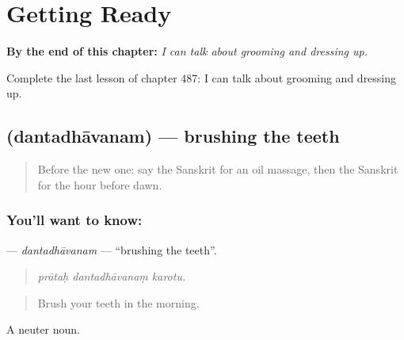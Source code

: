 
\chapter{Getting Ready}
\label{ch:sa-getting-ready}

\begin{chapteropening}
\textbf{By the end of this chapter:} \emph{I can talk about grooming and dressing up.}

Complete the last lesson of chapter 487: I can talk about grooming and dressing up.
\end{chapteropening}

\section[\texorpdfstring{\sk{दन्तधावनम्} (dantadhāvanam)}{दन्तधावनम् (dantadhāvanam)}]{ (dantadhāvanam) — brushing the teeth}

\label{lesson:SA-C487-dantadhavanam}



\begin{quote}
Before the new one: say the Sanskrit for an oil massage, then the Sanskrit for the hour before dawn.
\end{quote}

\subsection*{You'll want to know: }
\textbf{} — \emph{dantadhāvanam} — \textquotedblleft{}brushing the teeth\textquotedblright{}.

\begin{quote}
  
\end{quote}

\begin{quote}
\emph{prātaḥ dantadhāvanaṃ karotu.}
\end{quote}

\begin{quote}
Brush your teeth in the morning.
\end{quote}

A neuter noun.

